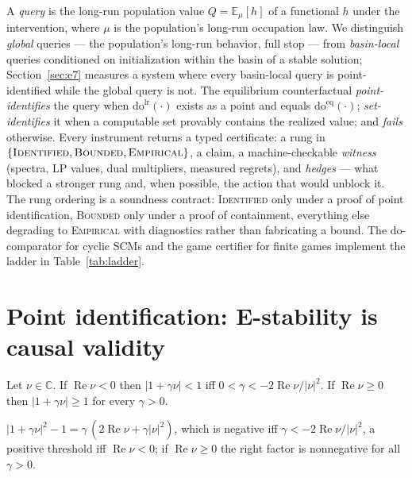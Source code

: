 \documentclass[pmlr]{jmlr}
\renewenvironment{proof}[1][\proofname]%
  {\par\noindent{\bfseries\upshape #1.\ }}{\jmlrQED}
\newcommand{\E}{\mathbb{E}}
\newcommand{\doop}{\mathrm{do}}
\newcommand{\doeq}[1]{\doop^{\mathrm{eq}}(#1)}
\newcommand{\dolr}[1]{\doop^{\mathrm{lr}}(#1)}
\newcommand{\Cid}{\textsc{Identified}}
\newcommand{\Cbd}{\textsc{Bounded}}
\newcommand{\Cem}{\textsc{Empirical}}
\begin{document}
A \emph{query} is the long-run population value $Q = \E_\mu[h]$ of a functional $h$ under the
intervention, where $\mu$ is the population's long-run occupation law. We distinguish
\emph{global} queries --- the population's long-run behavior, full stop --- from
\emph{basin-local} queries conditioned on initialization within the basin of a stable solution;
Section~\ref{sec:e7} measures a system where every basin-local query is point-identified while
the global query is not. The equilibrium counterfactual \emph{point-identifies} the query when
$\dolr{\cdot}$ exists as a point and equals $\doeq{\cdot}$; \emph{set-identifies} it when a
computable set provably contains the realized value; and \emph{fails} otherwise.
\label{sec:certificates}%
Every instrument returns a typed certificate: a rung in $\{\Cid, \Cbd, \Cem\}$, a claim, a
machine-checkable \emph{witness} (spectra, LP values, dual multipliers, measured regrets), and
\emph{hedges} --- what blocked a stronger rung and, when possible, the action that would unblock
it. The rung ordering is a soundness contract: \Cid{} only under a proof of point
identification, \Cbd{} only under a proof of containment, everything else degrading to \Cem{}
with diagnostics rather than fabricating a bound. The $\doop$-comparator for cyclic SCMs and the
game certifier for finite games implement the ladder in Table~\ref{tab:ladder}.

\section{Point identification: E-stability is causal validity}\label{sec:t1}

\begin{lemma}\label{lem:gain}
Let $\nu \in \mathbb{C}$. If $\operatorname{Re}\nu < 0$ then $|1 + \gamma\nu| < 1$ iff
$0 < \gamma < -2\operatorname{Re}\nu / |\nu|^2$. If $\operatorname{Re}\nu \geq 0$ then
$|1 + \gamma\nu| \geq 1$ for every $\gamma > 0$.
\end{lemma}
\begin{proof}
$|1+\gamma\nu|^2 - 1 = \gamma\,(2\operatorname{Re}\nu + \gamma |\nu|^2)$, which is negative iff
$\gamma < -2\operatorname{Re}\nu/|\nu|^2$, a positive threshold iff $\operatorname{Re}\nu < 0$;
if $\operatorname{Re}\nu \geq 0$ the right factor is nonnegative for all $\gamma>0$.
\end{proof}
\end{document}
